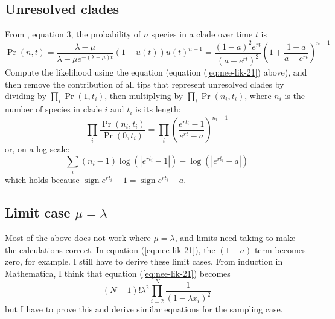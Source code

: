 \documentclass[12pt]{article}
\newcommand{\sign}{\mathop{\mathrm{sign}}}
\begin{document}
\subsection{Unresolved clades}
From \citet{Nee-1994-305}, equation 3, the probability of $n$ species
in a clade over time $t$ is
\begin{equation}
  \label{eq:pnNee}
  \Pr(n,t) = \frac{\lambda - \mu}{\lambda-\mu e^{-(\lambda-\mu)t}}  
  (1-u(t))u(t)^{n-1} = \frac{(1-a)^2e^{rt}}{(a-e^{rt})^2}
  \left(1 + \frac{1-a}{a-e^{rt}}\right)^{n-1}
\end{equation}
Compute the likelihood using the \citet{Nee-1994-305} equation
(equation (\ref{eq:nee-lik-21}) above), and then remove the
contribution of all tips that represent unresolved clades by dividing
by $\prod_i \Pr(1,t_i)$, then multiplying by $\prod_i \Pr(n_i,t_i)$,
where $n_i$ is the number of species in clade $i$ and $t_i$ is its
length:
\begin{equation}
  \prod_i \frac{\Pr(n_i,t_i)}{\Pr(0,t_i)} = 
  \prod_i \left(\frac{e^{rt_i}-1}{e^{rt}-a}\right)^{n_i-1}
\end{equation}
or, on a log scale:
\begin{equation}
  \sum_i (n_i-1) \log(|e^{rt_i}-1|) - \log(|e^{rt_i}-a|)
\end{equation}
which holds because $\sign{e^{rt_i}-1} = \sign{e^{rt_i}-a}$.

\subsection{Limit case $\mu = \lambda$}
Most of the above does not work where $\mu = \lambda$, and limits need
taking to make the calculations correct.  In equation
(\ref{eq:nee-lik-21}), the $(1-a)$ term becomes zero, for example.  I
still have to derive these limit cases.  From induction in
Mathematica, I think that equation (\ref{eq:nee-lik-21}) becomes
\begin{equation}
  (N-1)! \lambda^2 \prod_{i=2}^{N}\frac{1}{(1-\lambda x_i)^2}
\end{equation}
but I have to prove this and derive similar equations for the sampling
case.
\end{document}
